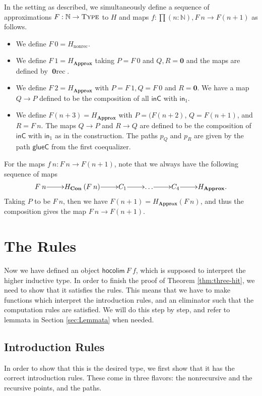 \documentclass[a4paper,UKenglish]{lipics-v2016}
\newcommand{\Boperator}[1]{\mathsf{#1}}
\newcommand{\inn}{\Boperator{in}}
\newcommand{\zero}[0]{\textbf{0}}
\newcommand{\frec}[0]{\!\operatorname{rec}}
\newcommand{\nonrec}[0]{\operatorname{nonrec}}
\newcommand{\Con}[0]{\textbf{Con}}
\newcommand{\Approx}[0]{\textbf{Approx}}
\newcommand{\inC}[0]{\Boperator{inC}}
\newcommand{\glueC}[0]{\Boperator{glueC}}
\newcommand{\hocolim}[0]{\Boperator{hocolim}}
\newcommand{\Type}[0]{\operatorname{\textsc{Type}}}
\begin{document}
\begin{definition}
In the setting as described, we simultaneously define a sequence of approximations $F : \mathbb{N} \rightarrow \Type$ to $H$ and maps $f : \prod(n : \mathbb{N}), F \> n \rightarrow F(n+1)$ as follows.
\begin{itemize}
        \item We define $F \> 0 = H_{\nonrec}$.
        \item We define $F \> 1 = H_{\Approx}$ taking $P = F \> 0$ and $Q, R = \zero$ and the maps are defined by $\zero\frec$.
        \item We define $F \> 2 = H_{\Approx}$ with $P= F \> 1, Q = F \> 0$ and $R =\zero$. We have a map $Q \rightarrow P$ defined to be the composition of all $\inC$ with $\inn_1$.
        \item We define $F(n+3) = H_{\Approx}$ with $P = (F(n+2)$, $Q = F(n+1)$, and $R = F \> n$. The maps $Q \rightarrow P$ and $R \rightarrow Q$ are defined to be the composition of $\inC$ with $\inn_1$ as in the construction. The paths $p_Q$ and $p_R$ are given by the path $\glueC$ from the first coequalizer.
\end{itemize}
For the maps $f \> n : F \> n \rightarrow F(n + 1)$, note that we always have the following sequence of maps
\[
\xymatrix@1
{
        F \> n \ar[r] & H_{\Con} \> (F \> n) \ar[r] & C_1 \ar[r] & \ldots \ar[r] & C_4 \ar[r] & H_{\Approx}.
}
\]
Taking $P$ to be $F \> n$, then we have $F (n+1) = H_{\Approx} (F \> n)$, and thus the composition gives the map $F \> n \rightarrow F(n + 1)$.
\end{definition}

\section{The Rules}
\label{sec:rules}
Now we have defined an object $\hocolim \> F \> f$, which is supposed to interpret the higher inductive type.
In order to finish the proof of Theorem \ref{thm:three-hit}, we need to show that it satisfies the rules.
This means that we have to make functions which interpret the introduction rules, and an eliminator such that the computation rules are satisfied.
We will do this step by step, and refer to lemmata in Section \ref{sec:Lemmata} when needed.

\subsection{Introduction Rules}
In order to show that this is the desired type, we first show that it has the correct introduction rules.
These come in three flavors: the nonrecursive and the recursive points, and the paths.
\end{document}
